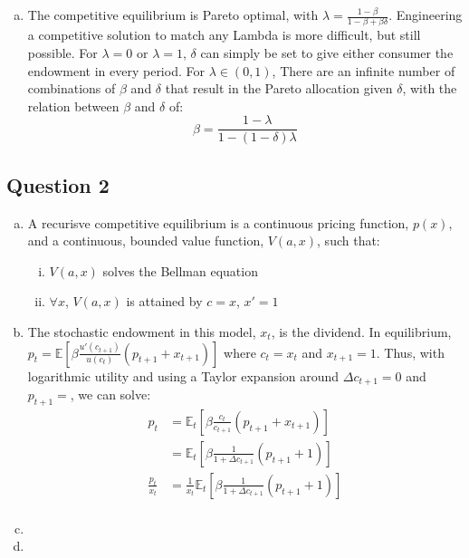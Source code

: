 \documentclass{article}
\newcommand{\dc}[1]{\Delta c_{#1}}
\newcommand{\E}[1]{\mathbb{E}\left[#1\right]} %
\newcommand{\Et}[1]{\mathbb{E}_t\left[#1\right]}
\begin{document}
\begin{enumerate}[(a)]
	\item The competitive equilibrium is Pareto optimal, with ${\lambda = \frac{1-\beta}{1-\beta+\beta\delta}}$. Engineering a competitive solution to match any Lambda is more difficult, but still possible. For ${\lambda=0}$ or ${\lambda=1}$, $\delta$ can simply be set to give either consumer the endowment in every period. For ${\lambda\in(0,1)}$, There are an infinite number of combinations of $\beta$ and $\delta$ that result in the Pareto allocation given $\delta$, with the relation between $\beta$ and $\delta$ of:
	\[
		\beta = \frac{1-\lambda}{1-(1-\delta)\lambda}
	\]
	
	
\end{enumerate}

\pagebreak
\subsection*{Question 2}

\begin{enumerate}[(a)]
	\item A recurisve competitive equilibrium is a continuous pricing function, $p(x)$, and a continuous, bounded value function, $V(a,x)$, such that:
		\begin{enumerate}[(i)]
			\item $V(a,x)$ solves the Bellman equation 
			\item $\forall x$, $V(a,x)$ is attained by $c=x$, $x'=1$
		\end{enumerate}
	
	\item The stochastic endowment in this model, $x_t$, is the dividend. In equilibrium, ${p_t = \E{\beta\frac{u'(c_{t+1})}{u(c_t)}(p_{t+1}+x_{t+1})}}$ where ${c_t=x_t}$ and ${x_{t+1}=1}$. Thus, with logarithmic utility and using a Taylor expansion around ${\dc{t+1}=0}$ and ${p_{t+1}=}$, we can solve:
		\begin{align*}
			p_t 			&= \Et{\beta\frac{c_t}{c_{t+1}}(p_{t+1}+x_{t+1})}			\\
							&= \Et{\beta\frac{1}{1+\dc{t+1}}(p_{t+1}+1)}				\\
			\frac{p_t}{x_t}	&= \frac{1}{x_t}\Et{\beta\frac{1}{1+\dc{t+1}}(p_{t+1}+1)}	\\
		\end{align*}
	
	
	\item 
	
	
	\item 
	
	
\end{enumerate}
\end{document}
